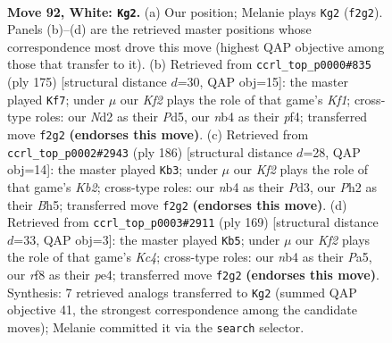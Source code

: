 \documentclass[11pt]{article}
\begin{document}
\clearpage

\begin{figure}[p]\centering
\begin{subfigure}{0.46\textwidth}\centering
\resizebox{\linewidth}{!}{%
\newchessgame
\chessboard[
  setfen={5r2/4kp2/6p1/4P2p/bnB2Pp1/8/3N1K1P/8 w - - 42 92},
  showmover=false,
  pgfstyle=straightmove, color=movearrow, markmove={f2-g2}
]}
\caption{}
\end{subfigure}\hfill
\begin{subfigure}{0.46\textwidth}\centering
\resizebox{\linewidth}{!}{%
\newchessgame
\chessboard[
  setfen={5k2/8/1p2pb2/p2p4/3P1PK1/P2BP3/1P6/8 b - - 56 88},
  showmover=false,
  pgfstyle=straightmove, color=movearrow, markmove={f8-f7}
]}
\caption{}
\end{subfigure}
\\[4pt]
\begin{subfigure}{0.46\textwidth}\centering
\resizebox{\linewidth}{!}{%
\newchessgame
\chessboard[
  setfen={8/4k3/1n1p1p1B/2p1pP1B/1pP5/3P4/1K6/8 w - - 15 94},
  showmover=false,
  pgfstyle=straightmove, color=movearrow, markmove={b2-b3}
]}
\caption{}
\end{subfigure}\hfill
\begin{subfigure}{0.46\textwidth}\centering
\resizebox{\linewidth}{!}{%
\newchessgame
\chessboard[
  setfen={8/8/8/p1kPp1p1/4P2p/b2K1P1P/P7/3B4 b - - 4 85},
  showmover=false,
  pgfstyle=straightmove, color=movearrow, markmove={c5-b5}
]}
\caption{}
\end{subfigure}
\caption{\textbf{Move 92, White: \texttt{Kg2}.} (a) Our position; Melanie plays \texttt{Kg2} (\texttt{f2g2}). Panels (b)--(d) are the retrieved master positions whose correspondence most drove this move (highest QAP objective among those that transfer to it). (b) Retrieved from \texttt{ccrl\_top\_p0000\#835} (ply 175) [structural distance $d$=30, QAP obj=15]: the master played \texttt{Kf7}; under $\mu$ our \emph{Kf2} plays the role of that game's \emph{Kf1}; cross-type roles: our \emph{N}d2 as their \emph{P}d5, our \emph{n}b4 as their \emph{p}f4; transferred move \texttt{f2g2} \textbf{(endorses this move)}. (c) Retrieved from \texttt{ccrl\_top\_p0002\#2943} (ply 186) [structural distance $d$=28, QAP obj=14]: the master played \texttt{Kb3}; under $\mu$ our \emph{Kf2} plays the role of that game's \emph{Kb2}; cross-type roles: our \emph{n}b4 as their \emph{P}d3, our \emph{P}h2 as their \emph{B}h5; transferred move \texttt{f2g2} \textbf{(endorses this move)}. (d) Retrieved from \texttt{ccrl\_top\_p0003\#2911} (ply 169) [structural distance $d$=33, QAP obj=3]: the master played \texttt{Kb5}; under $\mu$ our \emph{Kf2} plays the role of that game's \emph{Kc4}; cross-type roles: our \emph{n}b4 as their \emph{P}a5, our \emph{r}f8 as their \emph{p}e4; transferred move \texttt{f2g2} \textbf{(endorses this move)}. Synthesis: 7 retrieved analogs transferred to \texttt{Kg2} (summed QAP objective 41, the strongest correspondence among the candidate moves); Melanie committed it via the \texttt{search} selector.}
\label{fig:thought-m182}
\end{figure}
\end{document}

